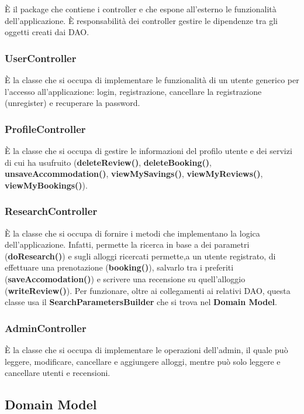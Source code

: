\documentclass[10pt]{article}
\begin{document}
\`E il package che contiene i controller e che espone all'esterno le funzionalità dell'applicazione. \`E responsabilità dei controller gestire le dipendenze tra gli oggetti creati dai DAO.

\subsubsection{UserController}

\`E la classe che si occupa di implementare le funzionalità di un utente generico per l'accesso all'applicazione: login, registrazione, cancellare la registrazione (unregister) e recuperare la password.

\subsubsection{ProfileController}

\`E la classe che si occupa di gestire le informazioni del profilo utente e dei servizi di cui ha usufruito (\textbf{deleteReview()}, \textbf{deleteBooking()}, \textbf{unsaveAccommodation()}, \textbf{viewMySavings()}, \textbf{viewMyReviews()}, \textbf{viewMyBookings()}).

\subsubsection{ResearchController}

\`E la classe che si occupa di fornire i metodi che implementano la logica dell'applicazione. Infatti, permette la ricerca in base a dei parametri (\textbf{doResearch()}) e sugli alloggi ricercati permette,a un utente registrato, di effettuare una prenotazione (\textbf{booking()}), salvarlo tra i preferiti (\textbf{saveAccomodation()}) e scrivere una recensione su quell'alloggio (\textbf{writeReview()}). Per funzionare, oltre ai collegamenti ai relativi DAO, questa classe usa il \textbf{SearchParametersBuilder} che si trova nel \textbf{Domain Model}.

\subsubsection{AdminController}

\`E la classe che si occupa di implementare le operazioni dell'admin, il quale può  leggere, modificare, cancellare e aggiungere alloggi, mentre può solo leggere e cancellare utenti e recensioni.
 
\subsection{Domain Model}
\end{document}
